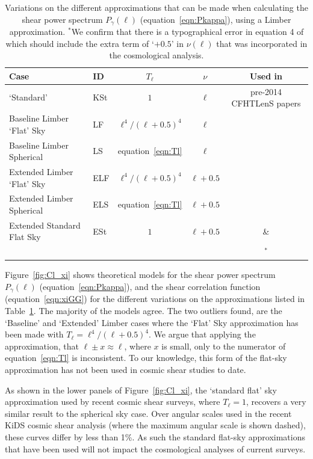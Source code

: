  \begin{table}[htb]
\begin{center}
\begin{tabular}{ | l | l | c | c  | c |}
\hline
Case & ID & $T_\ell$ & $\nu$ & Used in \\ \hline
\citet{kitching/etal:2016} `Standard' & KSt & $1$ & $\ell$ & pre-2014 CFHTLenS papers \\
Baseline Limber `Flat' Sky &  LF & $\ell^4 / (\ell + 0.5)^4$ & $\ell$ & \\
Baseline Limber Spherical & LS & equation~\ref{eqn:Tl} & $\ell$ & \\
Extended Limber `Flat' Sky & ELF & $\ell^4 / (\ell + 0.5)^4$ & $\ell + 0.5$ & \\
Extended Limber Spherical & ELS & equation~\ref{eqn:Tl}& $\ell + 0.5$  & \\
Extended Standard Flat Sky & ESt & $1$ & $\ell + 0.5$ & \citet{joudaki/etal:2016} \&  \\
  &  & & & \citet{hildebrandt/etal:2016}$^*$\\\hline
 \end{tabular}
 \end{center}
 \caption{\label{tab:Tl_nu}Variations on the different approximations that can be made when calculating the shear power spectrum $P_\gamma(\ell)$ (equation~\ref{eqn:Pkappa}), using a Limber approximation.  $^*$We confirm that there is a typographical error in equation 4 of \citet{hildebrandt/etal:2016} which should include the extra term of `$+0.5$' in $\nu(\ell)$ that was incorporated in the cosmological analysis.} 
 \end{table}

Figure~\ref{fig:Cl_xi} shows theoretical models for the shear power spectrum $P_\gamma(\ell)$ (equation~\ref{eqn:Pkappa}), and the shear correlation function (equation~\ref{eqn:xiGG}) for the different variations on the approximations listed in Table~\ref{tab:Tl_nu}.   The majority of the models agree.  The two outliers found, are the `Baseline' and `Extended' Limber cases where the \citet{kitching/etal:2016} `Flat' Sky approximation has been made with $T_\ell = \ell^4 / (\ell + 0.5)^4$.    We argue that applying the approximation, that $\ell \pm x \approx \ell$, where $x$ is small, only to the numerator of equation~\ref{eqn:Tl} is inconsistent.    To our knowledge, this form of the flat-sky approximation has not been used in cosmic shear studies to date.

As shown in the lower panels of Figure~\ref{fig:Cl_xi}, the `standard flat' sky approximation used by recent cosmic shear surveys, where $T_\ell = 1$, recovers a very similar result to the spherical sky case.  Over angular scales used in the recent KiDS cosmic shear analysis (where the maximum angular scale is shown dashed), these curves differ by less than 1\%.  As such the standard flat-sky approximations that have been used will not impact the cosmological analyses of current surveys.
 
